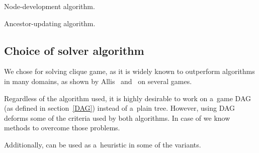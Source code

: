 \begin{table}
    \begin{itemize*}
    \item [] 
    \item [] 
      \begin{itemize*}
      \item [] 
      \item [] 
      \end{itemize*}
    \item [] 
    \end{itemize*}
\caption{Node-development algorithm.}
\label{devolopNode}
\end{table}

\begin{table}
    \begin{itemize*}
    \item [] 
      \begin{itemize*}
      \item [] 
      \item [] 
      \end{itemize*}
    \item [] 
    \end{itemize*}
\caption{Ancestor-updating algorithm.}
\label{updateAncestors}
\end{table}


\subsection{Choice of solver algorithm}

We chose  for solving clique game, as it is widely known to outperform 
algorithms in many domains, as shown by Allis~\cite{allis} and~\cite{divne} on several games. 

Regardless of the algorithm used, it is highly desirable to work on a~game DAG
(as defined in section~\ref{DAG}) instead of a~plain tree. However, using DAG deforms some
of the criteria used by both algorithms. In case of  we know methods to
overcome those problems.

Additionally,  can be used as a~heuristic in some of the  variants.

